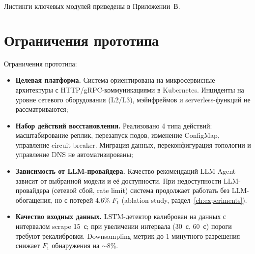 Листинги ключевых модулей приведены в Приложении~В.

\section{Ограничения прототипа}

Ограничения прототипа:

\begin{itemize}
    \item \textbf{Целевая платформа.} Система ориентирована на микросервисные архитектуры с HTTP/gRPC-коммуникациями в Kubernetes. Инциденты на уровне сетевого оборудования (L2/L3), мэйнфреймов и serverless-функций не рассматриваются;

    \item \textbf{Набор действий восстановления.} Реализовано 4 типа действий: масштабирование реплик, перезапуск подов, изменение ConfigMap, управление circuit breaker. Миграция данных, переконфигурация топологии и управление DNS не автоматизированы;

    \item \textbf{Зависимость от LLM-провайдера.} Качество рекомендаций LLM Agent зависит от выбранной модели и её доступности. При недоступности LLM-провайдера (сетевой сбой, rate limit) система продолжает работать без LLM-обогащения, но с потерей 4.6\% $F_1$ (ablation study, раздел~\ref{ch:experiments}).

    \item \textbf{Качество входных данных.} LSTM-детектор калиброван на данных с интервалом scrape 15~с; при увеличении интервала (30~с, 60~с) пороги требуют рекалибровки. Downsampling метрик до 1-минутного разрешения снижает $F_1$ обнаружения на $\sim$8\%.
\end{itemize}
